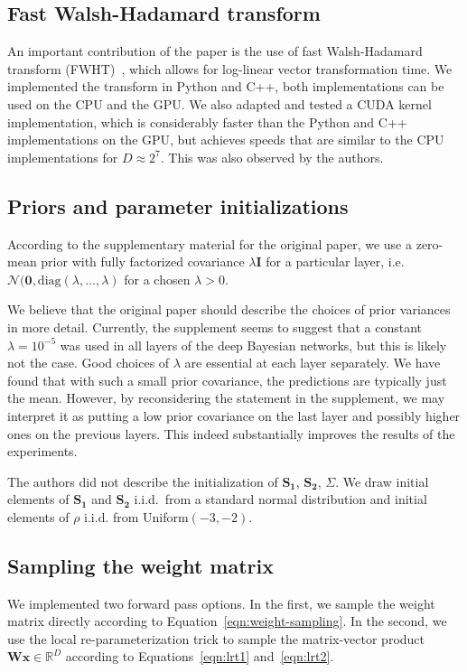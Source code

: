 \documentclass[11pt, twocolumn]{article}
\begin{document}
    \subsection{Fast Walsh-Hadamard transform}
    An important contribution of the paper is the use of fast Walsh-Hadamard transform (FWHT)~\cite{fino1976unified}, which allows for log-linear vector transformation time.
    We implemented the transform in Python and C++, both implementations can be used on the CPU and the GPU.
    We also adapted and tested a CUDA kernel implementation, which is considerably faster than the Python and C++ implementations on the GPU, but achieves speeds that are similar to the CPU implementations for $D \approx 2^7$.
    This was also observed by the authors.

    \subsection{Priors and parameter initializations}
    According to the supplementary material for the original paper, we use a zero-mean prior with fully factorized covariance $\lambda \mathbf{I}$ for a particular layer, i.e. $\mathcal{N}(\mathbf{0}, \mathrm{diag}(\lambda, \dots, \lambda)$ for a chosen $\lambda > 0$.

    We believe that the original paper should describe the choices of prior variances in more detail.
    Currently, the supplement seems to suggest that a constant $\lambda = 10^{-5}$ was used in all layers of the deep Bayesian networks, but this is likely not the case.
    Good choices of $\lambda$ are essential at each layer separately.
    We have found that with such a small prior covariance, the predictions are typically just the mean.
    However, by reconsidering the statement in the supplement, we may interpret it as putting a low prior covariance on the last layer and possibly higher ones on the previous layers.
    This indeed substantially improves the results of the experiments.

    The authors did not describe the initialization of $\mathbf{S_1}$, $\mathbf{S_2}$, $\Sigma$.
    We draw initial elements of $\mathbf{S_1}$ and $\mathbf{S_2}$ i.i.d.\ from a standard normal distribution and initial elements of $\rho$ i.i.d. from Uniform$(-3, -2)$.

    \subsection{Sampling the weight matrix}\label{subsec:sampling-the-weight-matrix}
    We implemented two forward pass options.
    In the first, we sample the weight matrix directly according to Equation~\ref{eqn:weight-sampling}.
    In the second, we use the local re-parameterization trick to sample the matrix-vector product $\mathbf{W}\mathbf{x} \in \mathbb{R}^D$ according to Equations~\ref{eqn:lrt1} and~\ref{eqn:lrt2}.
\end{document}
